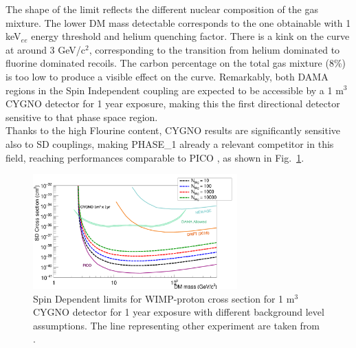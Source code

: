 \documentclass[physics,article,submit,moreauthors,pdftex]{Definitions/mdpi}
\begin{document}
The shape of the limit reflects the different nuclear composition of the gas mixture. The lower DM mass detectable corresponds to the one obtainable with 1 keV$_{ee}$ energy threshold and helium quenching factor. There is a kink on the curve at around 3 GeV/c$^2$, corresponding to the transition from helium dominated to fluorine dominated recoils. The carbon percentage on the total gas mixture (8\%) is too low to produce a visible effect on the curve. Remarkably, both DAMA regions in the Spin Independent coupling are expected to be accessible by a 1 m$^3$ CYGNO detector for 1 year exposure, making this the first directional detector sensitive to that phase space region.\\
Thanks to the high Flourine content, CYGNO results are significantly sensitive also to SD couplings, making PHASE\_1 already a relevant competitor in this field, reaching performances comparable to PICO \cite{bib:Amole_2019}, as shown in Fig.~\ref{fig:SD}. 
\begin{figure}[t!]
\centering
 \includegraphics[width=0.7\textwidth]{1m3_1y_SD.pdf}
 \caption{Spin Dependent limits for WIMP-proton cross section for 1 m$^3$ CYGNO detector for 1 year exposure with different background level assumptions. The line representing other experiment are taken from \cite{bib:Savage_2004,bib:Battat_2017,bib:Amole_2019,bib:yakabe2020limits}.}
 \label{fig:SD}
 \end{figure}
\end{document}
